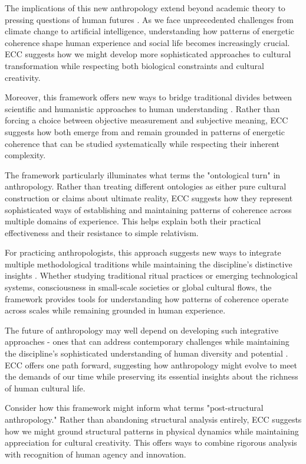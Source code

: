 The implications of this new anthropology extend beyond academic theory to pressing questions of human futures \cite{haraway2016staying}. As we face unprecedented challenges from climate change to artificial intelligence, understanding how patterns of energetic coherence shape human experience and social life becomes increasingly crucial. ECC suggests how we might develop more sophisticated approaches to cultural transformation while respecting both biological constraints and cultural creativity.

Moreover, this framework offers new ways to bridge traditional divides between scientific and humanistic approaches to human understanding \cite{stengers2018another}. Rather than forcing a choice between objective measurement and subjective meaning, ECC suggests how both emerge from and remain grounded in patterns of energetic coherence that can be studied systematically while respecting their inherent complexity.

The framework particularly illuminates what \cite{bessire2014ontological} terms the "ontological turn" in anthropology. Rather than treating different ontologies as either pure cultural construction or claims about ultimate reality, ECC suggests how they represent sophisticated ways of establishing and maintaining patterns of coherence across multiple domains of experience. This helps explain both their practical effectiveness and their resistance to simple relativism.

For practicing anthropologists, this approach suggests new ways to integrate multiple methodological traditions while maintaining the discipline's distinctive insights \cite{rabinow2008marking}. Whether studying traditional ritual practices or emerging technological systems, consciousness in small-scale societies or global cultural flows, the framework provides tools for understanding how patterns of coherence operate across scales while remaining grounded in human experience.

The future of anthropology may well depend on developing such integrative approaches - ones that can address contemporary challenges while maintaining the discipline's sophisticated understanding of human diversity and potential \cite{ortner2016dark}. ECC offers one path forward, suggesting how anthropology might evolve to meet the demands of our time while preserving its essential insights about the richness of human cultural life.

Consider how this framework might inform what \cite{viveiros2014cannibal} terms "post-structural anthropology." Rather than abandoning structural analysis entirely, ECC suggests how we might ground structural patterns in physical dynamics while maintaining appreciation for cultural creativity. This offers ways to combine rigorous analysis with recognition of human agency and innovation.

